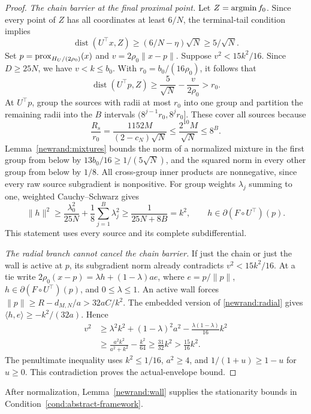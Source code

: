 {\begin{proof}
\emph{The chain barrier at the final proximal point.}
Let $Z=\operatorname*{argmin} f_0$. Since every point of $Z$ has all
coordinates at least $6/N$, the terminal-tail condition implies
\[
 \operatorname{dist}(U^\top x,Z)
 \geq(6/N-\eta)\sqrt N\geq5/\sqrt N.
\]
Set $p=\operatorname{prox}_{H_U/(2\rho_0)}(x)$ and
$v=2\rho_0\|x-p\|$. Suppose $v^2<15k^2/16$.
Since $D\geq25N$, we have $v<k\leq b_0$.
With $r_0=b_0/(16\rho_0)$, it follows that
\[
 \operatorname{dist}(U^\top p,Z)
 \geq\frac5{\sqrt N}-\frac{v}{2\rho_0}>r_0.
\]
At $U^\top p$, group the sources with radii at most $r_0$ into
one group and partition the remaining radii into the $B$ intervals
$(8^{j-1}r_0,8^jr_0]$. These cover all sources because
\[
 \frac{R_s}{r_0}
 =\frac{1152M}{(2-c_N)\sqrt N}
 \leq\frac{2^{10}M}{\sqrt N}\leq8^B.
\]
Lemma~\ref{newrand:mixtures} bounds the norm of a normalized
mixture in the first group from below by
$13b_0/16\geq1/(5\sqrt N)$, and the squared norm in every other
group from below by $1/8$.
All cross-group inner products are nonnegative, since every raw
source subgradient is nonpositive. For group weights $\lambda_j$
summing to one, weighted Cauchy--Schwarz gives
\begin{equation}
 \|h\|^2\geq\frac{\lambda_0^2}{25N}
          +\frac18\sum_{j=1}^B\lambda_j^2
 \geq\frac1{25N+8B}=k^2,
 \qquad h\in\partial(F\circ U^\top)(p).
 \label{newrand:pointwise-mixture}
\end{equation}
This statement uses every source and its complete subdifferential.

\emph{The radial branch cannot cancel the chain barrier.}
If just the chain or just the wall is active at $p$, its
subgradient norm already contradicts $v^2<15k^2/16$.
At a tie write
$2\rho_0(x-p)=\lambda h+(1-\lambda)ae$, where
$e=p/\|p\|$, $h\in\partial(F\circ U^\top)(p)$, and
$0\le\lambda\le1$.
An active wall forces
$\|p\|\ge R-d_{M,N}/a>32aC/k^2$.
The embedded version of \eqref{newrand:radial} gives
$\langle h,e\rangle\ge-k^2/(32a)$.  Hence
\begin{align*}
 v^2&\ge\lambda^2k^2+(1-\lambda)^2a^2
             -\frac{\lambda(1-\lambda)}{16}k^2\\
 &\ge\frac{a^2k^2}{a^2+k^2}-\frac{k^2}{64}
 \ge\frac{31}{32}k^2>\frac{15}{16}k^2.
\end{align*}
The penultimate inequality uses $k^2\le1/16$, $a^2\ge4$, and
$1/(1+u)\ge1-u$ for $u\ge0$.
This contradiction proves the actual-envelope bound.
\end{proof}
}


After normalization, Lemma~\ref{newrand:wall} supplies the
stationarity bounds in Condition~\ref{cond:abstract-framework}.

